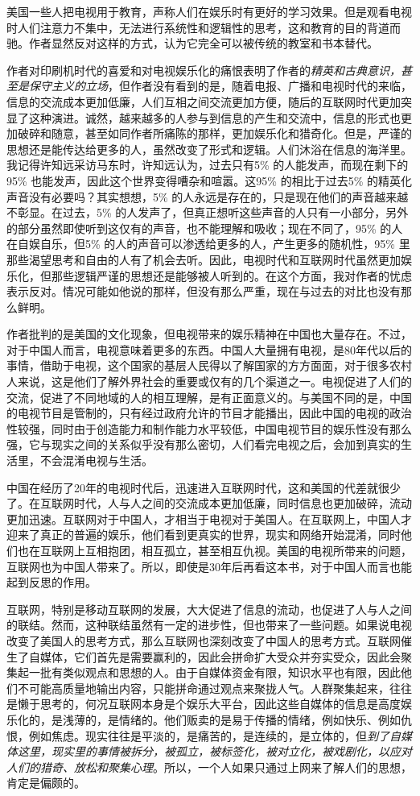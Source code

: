 美国一些人把电视用于教育，声称人们在娱乐时有更好的学习效果。但是观看电视时人们注意力不集中，无法进行系统性和逻辑性的思考，这和教育的目的背道而驰。作者显然反对这样的方式，认为它完全可以被传统的教室和书本替代。

作者对印刷机时代的喜爱和对电视娱乐化的痛恨表明了作者的\emph{精英和古典意识，甚至是保守主义的立场}，但作者没有看到的是，随着电报、广播和电视时代的来临，信息的交流成本更加低廉，人们互相之间交流更加方便，随后的互联网时代更加突显了这种演进。诚然，越来越多的人参与到信息的产生和交流中，信息的形式也更加破碎和随意，甚至如同作者所痛陈的那样，更加娱乐化和猎奇化。但是，严谨的思想还是能传达给更多的人，虽然改变了形式和逻辑。人们沐浴在信息的海洋里。我记得许知远采访马东时，许知远认为，过去只有5\% 的人能发声，而现在剩下的95\% 也能发声，因此这个世界变得嘈杂和喧嚣。这95\% 的相比于过去5\% 的精英化声音没有必要吗？其实想想，5\% 的人永远是存在的，只是现在他们的声音越来越不彰显。在过去，5\% 的人发声了，但真正想听这些声音的人只有一小部分，另外的部分虽然即使听到这仅有的声音，也不能理解和吸收；现在不同了，95\% 的人在自娱自乐，但5\% 的人的声音可以渗透给更多的人，产生更多的随机性，95\% 里那些渴望思考和自由的人有了机会去听。因此，电视时代和互联网时代虽然更加娱乐化，但那些逻辑严谨的思想还是能够被人听到的。在这个方面，我对作者的忧虑表示反对。情况可能如他说的那样，但没有那么严重，现在与过去的对比也没有那么鲜明。

作者批判的是美国的文化现象，但电视带来的娱乐精神在中国也大量存在。不过，对于中国人而言，电视意味着更多的东西。中国人大量拥有电视，是80年代以后的事情，借助于电视，这个国家的基层人民得以了解国家的方方面面，对于很多农村人来说，这是他们了解外界社会的重要或仅有的几个渠道之一。电视促进了人们的交流，促进了不同地域的人的相互理解，是有正面意义的。与美国不同的是，中国的电视节目是管制的，只有经过政府允许的节目才能播出，因此中国的电视的政治性较强，同时由于创造能力和制作能力水平较低，中国电视节目的娱乐性没有那么强，它与现实之间的关系似乎没有那么密切，人们看完电视之后，会加到真实的生活里，不会混淆电视与生活。

中国在经历了20年的电视时代后，迅速进入互联网时代，这和美国的代差就很少了。在互联网时代，人与人之间的交流成本更加低廉，同时信息也更加破碎，流动更加迅速。互联网对于中国人，才相当于电视对于美国人。在互联网上，中国人才迎来了真正的普遍的娱乐，他们看到更真实的世界，现实和网络开始混淆，同时他们也在互联网上互相抱团，相互孤立，甚至相互仇视。美国的电视所带来的问题，互联网也为中国人带来了。所以，即使是30年后再看这本书，对于中国人而言也能起到反思的作用。

互联网，特别是移动互联网的发展，大大促进了信息的流动，也促进了人与人之间的联结。然而，这种联结虽然有一定的进步性，但也带来了一些问题。如果说电视改变了美国人的思考方式，那么互联网也深刻改变了中国人的思考方式。互联网催生了自媒体，它们首先是需要赢利的，因此会拼命扩大受众并夯实受众，因此会聚集起一批有类似观点和思想的人。由于自媒体资金有限，知识水平也有限，因此他们不可能高质量地输出内容，只能拼命通过观点来聚拢人气。人群聚集起来，往往是懒于思考的，何况互联网本身是个娱乐大平台，因此这些自媒体的信息是高度娱乐化的，是浅薄的，是情绪的。他们贩卖的是易于传播的情绪，例如快乐、例如仇恨，例如焦虑。现实往往是平淡的，是痛苦的，是连续的，是立体的，但\emph{到了自媒体这里，现实里的事情被拆分，被孤立，被标签化，被对立化，被戏剧化，以应对人们的猎奇、放松和聚集心理}。所以，一个人如果只通过上网来了解人们的思想，肯定是偏颇的。

